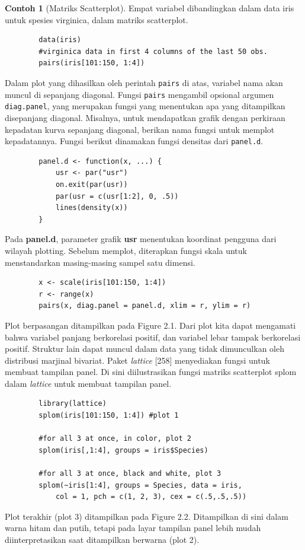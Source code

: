 \documentclass[a4paper,12pt]{article}
\theoremstyle{definition}
\newtheorem{example}{Contoh}[section]
\begin{document}
\begin{example}[Matriks Scatterplot]
    Empat variabel dibandingkan dalam data iris untuk spesies virginica, dalam matriks scatterplot.
    \begin{verbatim}
        data(iris)
        #virginica data in first 4 columns of the last 50 obs.
        pairs(iris[101:150, 1:4])
    \end{verbatim}
    Dalam plot yang dihasilkan oleh perintah \texttt{pairs} di atas, variabel nama akan muncul di sepanjang diagonal. Fungsi \texttt{pairs} mengambil opsional argumen \texttt{diag.panel}, yang merupakan fungsi yang menentukan apa yang ditampilkan disepanjang diagonal. Misalnya, untuk mendapatkan grafik dengan perkiraan kepadatan kurva sepanjang diagonal, berikan nama fungsi untuk memplot kepadatannya. Fungsi berikut dinamakan fungsi densitas dari \texttt{panel.d}.
    \begin{verbatim}
        panel.d <- function(x, ...) {
            usr <- par("usr")
            on.exit(par(usr))
            par(usr = c(usr[1:2], 0, .5))
            lines(density(x))
        }
    \end{verbatim}
    Pada \textbf{panel.d}, parameter grafik \textbf{usr} menentukan koordinat pengguna dari wilayah plotting. Sebelum memplot, diterapkan fungsi skala untuk menstandarkan masing-masing sampel satu dimensi.
    \begin{verbatim}
        x <- scale(iris[101:150, 1:4])
        r <- range(x)
        pairs(x, diag.panel = panel.d, xlim = r, ylim = r)
    \end{verbatim}
    Plot berpasangan ditampilkan pada Figure 2.1. Dari plot kita dapat mengamati bahwa variabel panjang berkorelasi positif, dan variabel lebar tampak berkorelasi positif. Struktur lain dapat muncul dalam data yang tidak dimunculkan oleh distribusi marjinal bivariat. Paket \textit{lattice} \citep{Sarkar2008}[258] menyediakan fungsi untuk membuat tampilan panel. Di sini diilustrasikan fungsi matriks scatterplot splom dalam \textit{lattice} untuk membuat tampilan panel.
    \begin{verbatim}
        library(lattice)
        splom(iris[101:150, 1:4]) #plot 1
        
        #for all 3 at once, in color, plot 2
        splom(iris[,1:4], groups = iris$Species)
        
        #for all 3 at once, black and white, plot 3
        splom(~iris[1:4], groups = Species, data = iris,
            col = 1, pch = c(1, 2, 3), cex = c(.5,.5,.5))
    \end{verbatim}
    Plot terakhir (plot 3) ditampilkan pada Figure 2.2. Ditampilkan di sini dalam warna hitam dan putih, tetapi pada layar tampilan panel lebih mudah diinterpretasikan saat ditampilkan berwarna (plot 2).
\end{example}
\end{document}
